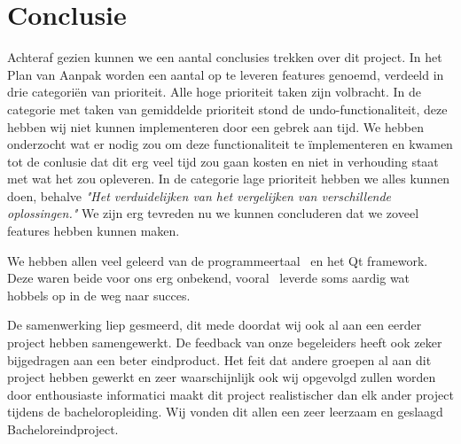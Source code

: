 \section{Conclusie}
Achteraf gezien kunnen we een aantal conclusies trekken over dit project. In het Plan van Aanpak worden een aantal op te leveren features genoemd, verdeeld in drie categori\"en van prioriteit. Alle hoge prioriteit taken zijn volbracht. In de categorie met taken van gemiddelde prioriteit stond de undo-functionaliteit, deze hebben wij niet kunnen implementeren door een gebrek aan tijd. We hebben onderzocht wat er nodig zou om deze functionaliteit te \"implementeren en kwamen tot de conlusie dat dit erg veel tijd zou gaan kosten en niet in verhouding staat met wat het zou opleveren. In de categorie lage prioriteit hebben we alles kunnen doen, behalve \emph{"Het verduidelijken van het vergelijken van verschillende oplossingen."} We zijn erg tevreden nu we kunnen concluderen dat we zoveel features hebben kunnen maken.

We hebben allen veel geleerd van de programmeertaal \cpp\ en het Qt framework. Deze waren beide voor ons erg onbekend, vooral \cpp\ leverde soms aardig wat hobbels op in de weg naar succes. 

De samenwerking liep gesmeerd, dit mede doordat wij ook al aan een eerder project hebben samengewerkt. De feedback van onze begeleiders heeft ook zeker bijgedragen aan een beter eindproduct. Het feit dat andere groepen al aan dit project hebben gewerkt en zeer waarschijnlijk ook wij opgevolgd zullen worden door enthousiaste informatici maakt dit project realistischer dan elk ander project tijdens de bacheloropleiding. Wij vonden dit allen een zeer leerzaam en geslaagd Bacheloreindproject.
